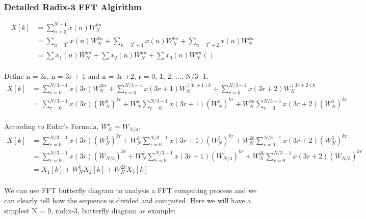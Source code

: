 \documentclass[12pt]{article}
\begin{document}
\subsubsection*{Detailed Radix-3 FFT Algirithm}

\begin{align*}
X[k] &= \sum\limits_{n=0}^{N-1}x(n)W_{N}^{kn}\\
& = \sum\limits_{n = 3^r}x(n)W_{N}^{kn} + \sum\limits_{n = 3^r+1}x(n)W_{N}^{kn} + \sum\limits_{n = 3^r+2}x(n)W_{N}^{kn}\\
& = \sum\limits x_1(n)W_{N}^{kn} + \sum\limits x_2(n)W_{N}^{kn} + \sum\limits x_3(n)W_{N}^{kn}  ()\\
\end{align*}


Define n = 3r, n = 3r + 1 and n = 3r +2, r = 0, 1, 2, ..., N/3 -1.\\

\begin{align*}
X[k] &= \sum\limits_{r=0}^{N/3 -1}x(3r)W_{N}^{3kr} + \sum\limits_{r=0}^{N/3 -1}x(3r+1)W_{N}^{(3r+ 1)k} + \sum\limits_{r=0}^{N/3 -1}x(3r+2)W_{N}^{(3r+ 2)k}\\
& =  \sum\limits_{r=0}^{N/3 -1}x(3r)(W_{N}^{3})^{kr} + W_{N}^{k}\sum\limits_{r=0}^{N/3 -1}x(3r+1)(W_{N}^{3})^{kr} + W_{N}^{2k}\sum\limits_{r=0}^{N/3 -1}x(3r+2)(W_{N}^{3})^{kr}\\
\end{align*}

According to Eular's Formula, $W_{N}^{a}$ = $W_{N/a}$,\\

\begin{align*}
X[k] & =  \sum\limits_{r=0}^{N/3 -1}x(3r)(W_{N}^{3})^{kr} + W_{N}^{k}\sum\limits_{r=0}^{N/3 -1}x(3r+1)(W_{N}^{3})^{kr} + W_{N}^{2k}\sum\limits_{r=0}^{N/3 -1}x(3r+2)(W_{N}^{3})^{kr}\\
& = \sum\limits_{r=0}^{N/3 -1}x(3r)(W_{N/3})^{kr} + W_{N}^{k}\sum\limits_{r=0}^{N/3 -1}x(3r+1)(W_{N/3})^{kr} + W_{N}^{2k}\sum\limits_{r=0}^{N/3 -1}x(3r+2)(W_{N/3})^{kr}\\
& = X_1[k] + W_N^kX_2[k] + W_N^{2k}X_3[k]\\
\end{align*}

We can use FFT butterfly diagram to analysis a FFT computing process and we can clearly tell how the sequence is divided and computed. Here we will have a simplest
N = 9, radix-3, butterfly diagram as example:\\
\end{document}
